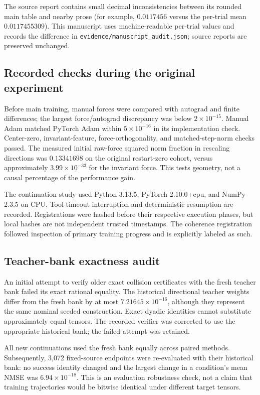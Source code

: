 \documentclass[11pt,letterpaper]{article}
\theoremstyle{remark}\newtheorem{remark}{Remark}
\begin{document}
The source report contains small decimal inconsistencies between its rounded main table and nearby prose (for example, $0.0117456$ versus the per-trial mean $0.0117455309$). This manuscript uses machine-readable per-trial values and records the difference in \texttt{evidence/manuscript\_audit.json}; source reports are preserved unchanged.

\subsection{Recorded checks during the original experiment}
Before main training, manual forces were compared with autograd and finite differences; the largest force/autograd discrepancy was below $2\times10^{-15}$. Manual Adam matched PyTorch Adam within $5\times10^{-16}$ in its implementation check. Center-zero, invariant-feature, force-orthogonality, and matched-step-norm checks passed. The measured initial raw-force squared norm fraction in rescaling directions was $0.13341698$ on the original restart-zero cohort, versus approximately $3.99\times10^{-33}$ for the invariant force. This tests geometry, not a causal percentage of the performance gain.

The continuation study used Python 3.13.5, PyTorch 2.10.0+cpu, and NumPy 2.3.5 on CPU. Tool-timeout interruption and deterministic resumption are recorded. Registrations were hashed before their respective execution phases, but local hashes are not independent trusted timestamps. The coherence registration followed inspection of primary training progress and is explicitly labeled as such.

\subsection{Teacher-bank exactness audit}
An initial attempt to verify older exact collision certificates with the fresh teacher bank failed its exact rational equality. The historical directional teacher weights differ from the fresh bank by at most $7.21645\times10^{-16}$, although they represent the same nominal seeded construction. Exact dyadic identities cannot substitute approximately equal tensors. The recorded verifier was corrected to use the appropriate historical bank; the failed attempt was retained.

All new continuations used the fresh bank equally across paired methods. Subsequently, 3,072 fixed-source endpoints were re-evaluated with their historical bank: no success identity changed and the largest change in a condition's mean NMSE was $6.94\times10^{-18}$. This is an evaluation robustness check, not a claim that training trajectories would be bitwise identical under different target tensors.
\end{document}
